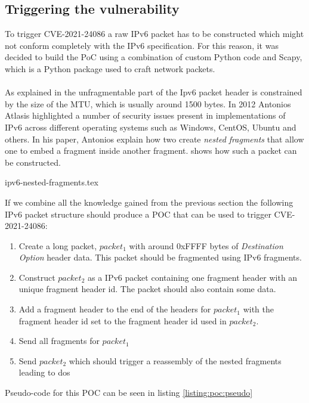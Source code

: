 \documentclass{report}
\begin{document}
\subsection{Triggering the vulnerability}
To trigger CVE-2021-24086 a raw IPv6 packet has to be constructed which might not conform completely with the IPv6 specification. For this reason, it was decided to build the PoC using a combination of custom Python code and Scapy\cite{url:ipv6:scapy}, which is a Python package used to craft network packets.
\\
\\
As explained in  the unfragmentable part of the Ipv6 packet header is constrained by the size of the MTU, which is usually around 1500 bytes. In 2012 Antonios Atlasis highlighted a number of security issues present in implementations of IPv6 across different operating systems such as Windows, CentOS, Ubuntu and others\cite{url:ipv6:abusing-ipv6}. In his paper, Antonios explain how two create \emph{nested fragments} that allow one to embed a fragment inside another fragment.  shows how such a packet can be constructed.

{ipv6-nested-fragments.tex}

If we combine all the knowledge gained from the previous section the following IPv6 packet structure should produce a \gls{POC} that can be used to trigger CVE-2021-24086:

\begin{enumerate}
    \item Create a long packet, $packet_1$ with around 0xFFFF bytes of \emph{Destination Option} header data. This packet should be fragmented using IPv6 fragments.
    \item Construct $packet_2$ as a IPv6 packet containing one fragment header with an unique fragment header id. The packet should also contain some data.
    \item Add a fragment header to the end of the headers for $packet_1$ with the fragment header id set to the fragment header id used in $packet_2$.
    \item Send all fragments for $packet_1$
    \item Send $packet_2$ which should trigger a reassembly of the nested fragments leading to \gls{dos}
\end{enumerate}

Pseudo-code for this \gls{POC} can be seen in listing \ref{listing:poc:pseudo}
\end{document}
